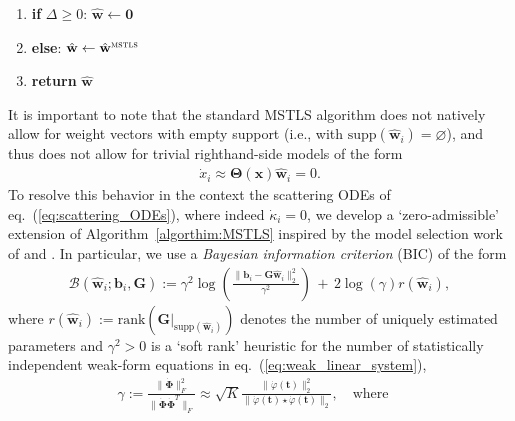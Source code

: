 \documentclass[journal=gmj]{CUP-JNL-DTM}%
\theoremstyle{definition}
\numberwithin{equation}{section}
\begin{document}
\begin{appendix}
{\begin{algorithm}
{\begin{enumerate}
        \smallskip

        \item \textbf{if} $\Delta \geq 0$: $\hat{\mathbf{w}} \leftarrow \mathbf{0}$

        \item[] \textbf{else}: $\hat{\mathbf{w}} \leftarrow \hat{\mathbf{w}}^{\textsc{mstls}}$

        \smallskip

        \item \textbf{return} $\hat{\mathbf{w}}$
    \end{enumerate}}
\end{algorithm}}

\vspace{-4mm}

It is important to note that the standard MSTLS algorithm does not natively allow for weight vectors with empty support (i.e., with $\text{supp}(\hat{\mathbf{w}}_i) = \varnothing$), and thus does not allow for trivial righthand-side models of the form \begin{align*}
    \dot{x}_i \approx \mathbf{\Theta}(\boldsymbol{x})\hat{\mathbf{w}}_i = 0.
\end{align*} To resolve this behavior in the context the scattering ODEs of eq.~(\ref{eq:scattering_ODEs}), where indeed $\dot{\kappa}_i = 0$, we develop a `zero-admissible' extension of Algorithm~\ref{algorthim:MSTLS} inspired by the model selection work of \cite{Mangan.etal2017ProcRSocA} and \cite{Messenger.etal2024JRSocInterfacea}. In particular, we use a \textit{Bayesian information criterion} (BIC) of the form \begin{align}\label{eq:BIC}
    \mathcal{B}(\hat{\mathbf{w}}_i; \mathbf{b}_i, \mathbf{G}) := \gamma^2\log\left( \frac{\|\mathbf{b}_i - \mathbf{G}\hat{\mathbf{w}}_i\|^2_2}{\gamma^2} \right) \, + \, 2\log(\gamma)r(\hat{\mathbf{w}}_i),
\end{align} where $r(\hat{\mathbf{w}}_i) := \text{rank}(\mathbf{G}|_{\text{supp}(\hat{\mathbf{w}}_i)})$ denotes the number of uniquely estimated parameters and $\gamma^2 > 0$ is a `soft rank' heuristic for the number of statistically independent weak-form equations in eq.~(\ref{eq:weak_linear_system}), \begin{align*}
    \gamma := \frac{\|\dot{\mathbf{\Phi}}\|^2_F}{\|\dot{\mathbf{\Phi}} \dot{\mathbf{\Phi}}^T\|_F}
    \approx \sqrt{K} \frac{\|\dot{\varphi}(\mathbf{t})\|^2_2}{\|\dot{\varphi}(\mathbf{t}) \star \dot{\varphi}(\mathbf{t})\|_2},
    \quad \text{where} \quad

\end{align*}
\end{appendix}
\end{document}
